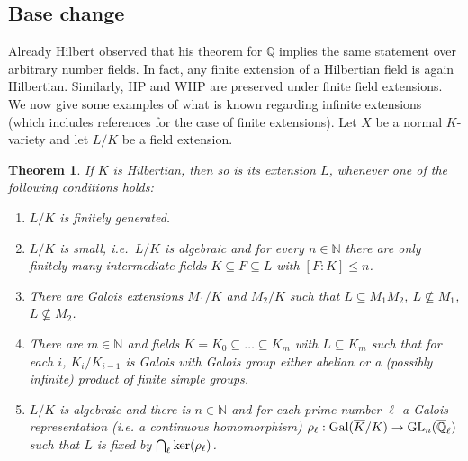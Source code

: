 \documentclass[10pt,a4paper]{amsart}
\theoremstyle{plain}
\newtheorem{theorem}{Theorem}
\theoremstyle{remark}
\numberwithin{theorem}{section}
\begin{document}
\subsection{Base change}
\label{sec:basechange}

Already Hilbert observed that his theorem for $\mathbb{Q}$
implies the same statement over arbitrary number fields.  In fact, any finite extension of a Hilbertian field is again Hilbertian.
Similarly, HP and WHP are preserved under finite field extensions.  
We now give some examples of what is known regarding infinite extensions (which includes references for the case of finite extensions).
Let 
$X$ be a normal $K$-variety and let
$L/K$ be a field extension.

\begin{theorem}\label{thm:permanence}
If $K$ is Hilbertian, then so is its extension $L$,
whenever one of the following conditions holds:
\begin{enumerate}
    \item $L/K$ is finitely generated.
    \item $L/K$ is small, i.e.~$L/K$ is algebraic and for every $n\in\mathbb{N}$ there are only finitely many intermediate fields $K\subseteq F\subseteq L$ with $[F:K]\leq n$.
    \item There are Galois extensions $M_1/K$ and $M_2/K$ such that
    $L\subseteq M_1M_2$, $L\not\subseteq M_1$, $L\not\subseteq M_2$.
     \item There are $m\in\mathbb{N}$ and fields $K=K_0\subseteq \dots\subseteq K_m$ with $L\subseteq K_m$
    such that for each $i$, $K_i/K_{i-1}$ is Galois with Galois group either abelian 
    or a (possibly infinite) product of finite simple groups.
    \item  
    $L/K$ is algebraic and there is $n\in\mathbb{N}$ and for each prime number $\ell$ a Galois representation (i.e. a continuous homomorphism)
    $\rho_\ell:{\rm Gal}(\overline{K}/K)\rightarrow{\rm GL}_n(\overline{\mathbb{Q}}_\ell)$  such that
    $L$ is fixed by $\bigcap_{\ell}{\rm ker}(\rho_\ell)$.
\end{enumerate}
\end{theorem}
\end{document}
